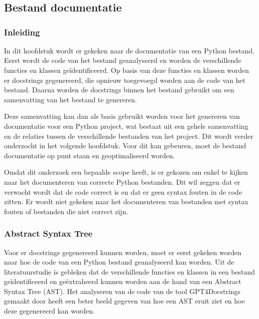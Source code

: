 \chapter{}%
\label{ch:resultaten}

\section{Bestand documentatie}
\label{sec:bestanddocumentatie}

\subsection{Inleiding}
\label{sec:bestanddocumentatie-inleiding}
In dit hoofdstuk wordt er gekeken naar de documentatie van een Python bestand.
Eerst wordt de code van het bestand geanalyseerd en worden de verschillende functies en klassen geïdentificeerd.
Op basis van deze functies en klassen worden er docstrings gegenereerd, die opnieuw toegevoegd worden aan de code van het bestand.
Daarna worden de docstrings binnen het bestand gebruikt om een samenvatting van het bestand te genereren.

Deze samenvatting kan dan als basis gebruikt worden voor het genereren van documentatie voor een Python project, wat bestaat uit een gehele samenvatting en de relaties tussen de verschillende bestanden van het project.
Dit wordt verder onderzocht in het volgende hoofdstuk.
Voor dit kan gebeuren, moet de bestand documentatie op punt staan en geoptimaliseerd worden.

Omdat dit onderzoek een bepaalde scope heeft, is er gekozen om enkel te kijken naar het documenteren van correcte Python bestanden.
Dit wil zeggen dat er verwacht wordt dat de code correct is en dat er geen syntax fouten in de code zitten.
Er wordt niet gekeken naar het documenteren van bestanden met syntax fouten of bestanden die niet correct zijn.

\subsection{Abstract Syntax Tree}
\label{sec:bestanddocumentatie-ast}
Voor er docstrings gegenereerd kunnen worden, moet er eerst gekeken worden naar hoe de code van een Python bestand geanalyseerd kan worden.
Uit de literatuurstudie is gebleken dat de verschillende functies en klassen in een bestand geïdentificeerd en geëxtraheerd kunnen worden aan de hand van een Abstract Syntax Tree (AST).
Het analyseren van de code van de tool GPT4Docstrings gemaakt door \textcite{Trofficus2023} heeft een beter beeld gegeven van hoe een AST eruit ziet en hoe deze gegenereerd kan worden.

